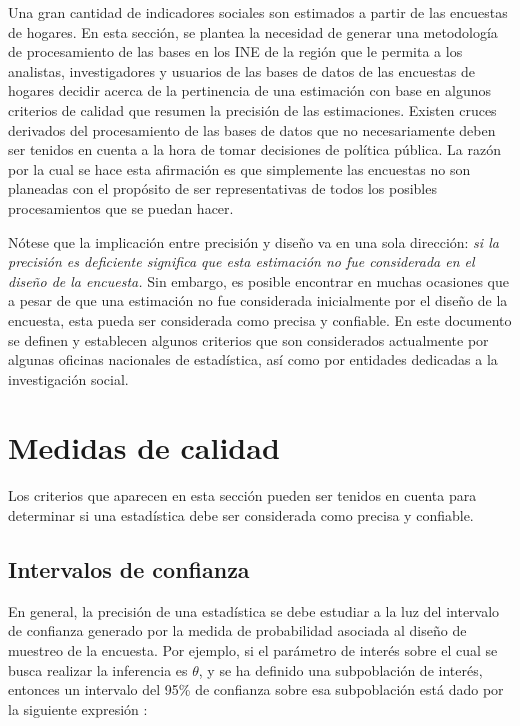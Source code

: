 \documentclass[
  12pt,
]{book}
\begin{document}
Una gran cantidad de indicadores sociales son estimados a partir de las encuestas de hogares. En esta sección, se plantea la necesidad de generar una metodología de procesamiento de las bases en los INE de la región que le permita a los analistas, investigadores y usuarios de las bases de datos de las encuestas de hogares decidir acerca de la pertinencia de una estimación con base en algunos criterios de calidad que resumen la precisión de las estimaciones. Existen cruces derivados del procesamiento de las bases de datos que no necesariamente deben ser tenidos en cuenta a la hora de tomar decisiones de política pública. La razón por la cual se hace esta afirmación es que simplemente las encuestas no son planeadas con el propósito de ser representativas de todos los posibles procesamientos que se puedan hacer.

Nótese que la implicación entre precisión y diseño va en una sola dirección: \emph{si la precisión es deficiente significa que esta estimación no fue considerada en el diseño de la encuesta.} Sin embargo, es posible encontrar en muchas ocasiones que a pesar de que una estimación no fue considerada inicialmente por el diseño de la encuesta, esta pueda ser considerada como precisa y confiable. En este documento se definen y establecen algunos criterios que son considerados actualmente por algunas oficinas nacionales de estadística, así como por entidades dedicadas a la investigación social.

\hypertarget{medidas-de-calidad}{%
\section{Medidas de calidad}\label{medidas-de-calidad}}

Los criterios que aparecen en esta sección pueden ser tenidos en cuenta para determinar si una estadística debe ser considerada como precisa y confiable.

\hypertarget{intervalos-de-confianza}{%
\subsection{Intervalos de confianza}\label{intervalos-de-confianza}}

En general, la precisión de una estadística se debe estudiar a la luz del intervalo de confianza generado por la medida de probabilidad asociada al diseño de muestreo de la encuesta. Por ejemplo, si el parámetro de interés sobre el cual se busca realizar la inferencia es \(\theta\), y se ha definido una subpoblación de interés, entonces un intervalo del 95\% de confianza sobre esa subpoblación está dado por la siguiente expresión \citep{Heeringa_West_Berglund_2010}:
\end{document}
